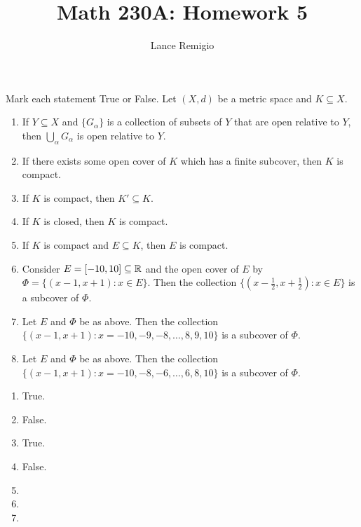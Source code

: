 \documentclass[a4paper]{article}
\title{Math 230A: Homework 5}
\author{Lance Remigio}
\begin{document}
\maketitle    
{}
\rhead{\thepage}

\begin{problem}
   Mark each statement True or False. Let \( (X,d) \) be a metric space and \( K \subseteq X  \). 
   \begin{enumerate}
       \item If \( Y \subseteq X   \) and \( \{ {G}_{\alpha} \}  \) is a collection of subsets of \( Y  \) that are open relative to \( Y  \), then \( \bigcup_{ \alpha }^{  } {G}_{\alpha} \) is open relative to \( Y  \).
        \item If there exists some open cover of \( K   \) which has a finite subcover, then \( K  \) is compact. 
        \item If \( K  \) is compact, then \( K' \subseteq K  \).
        \item If \( K  \) is closed, then \( K  \) is compact.
        \item If \( K  \) is compact and \( E \subseteq K \), then \( E  \) is compact.
        \item Consider \( E = [-10,10] \subseteq \mathbb{R}  \) and the open cover of \( E  \) by \( \Phi = \{ (x-1,x + 1) : x \in E  \}  \). Then the collection \( \{ (x - \frac{ 1 }{ 2 }  , x + \frac{ 1 }{ 2 } ) : x \in E  \}  \) is a subcover of \( \Phi \).
        \item Let \( E  \) and \( \Phi \) be as above. Then the collection \( \{ (x-1, x+1): x = -10,-9,-8, \dots, 8, 9, 10 \}  \) is a subcover of \( \Phi \).
        \item Let \( E  \) and \( \Phi \) be as above. Then the collection \( \{ (x-1, x+1): x = -10,-8, -6, \dots, 6, 8, 10 \}  \) is a subcover of \( \Phi \).
   \end{enumerate}
\end{problem}
   \begin{solution}
   \begin{enumerate}
       \item True.
        \item False.
        \item True.
        \item False.
        \item 
        \item 
        \item
   \end{enumerate}
   \end{solution}
\end{document}
